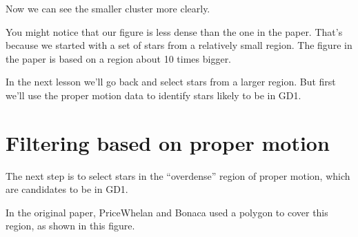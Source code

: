 \documentclass[letterpaper,10pt,english]{sphinxmanual}
\begin{document}
\begin{sphinxVerbatim}[commandchars=\\\{\}]
  \PYG{p}{[}\PYG{p}{]}
  \PYG{p}{[}\PYG{p}{]}

    
    

 
 
\end{sphinxVerbatim}

\noindent{}

Now we can see the smaller cluster more clearly.

You might notice that our figure is less dense than the one in the paper.  That’s because we started with a set of stars from a relatively small region.  The figure in the paper is based on a region about 10 times bigger.

In the next lesson we’ll go back and select stars from a larger region.  But first we’ll use the proper motion data to identify stars likely to be in GD\sphinxhyphen{}1.


\section{Filtering based on proper motion}
\label{\detokenize{03_motion:filtering-based-on-proper-motion}}
The next step is to select stars in the “overdense” region of proper motion, which are candidates to be in GD\sphinxhyphen{}1.

In the original paper, Price\sphinxhyphen{}Whelan and Bonaca used a polygon to cover this region, as shown in this figure.
\end{document}
